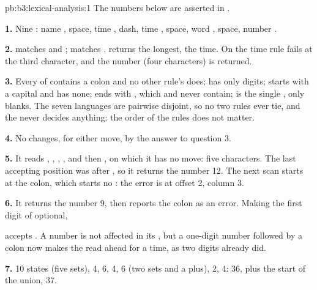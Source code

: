 \begin{solution}{pb:b3:lexical-analysis:1}
The numbers below are asserted in .

\textbf{1.} Nine : name , space, time , dash, time , space, word , space, number .

\textbf{2.}  matches  and ;  matches .  returns the longest, the time. On  the time rule fails at the third character, and the number  (four characters) is returned.

\textbf{3.} Every  of  contains a colon and no other rule's does;  has only digits;  starts with a capital and  has none;  ends with \code{>}, which  and  never contain;  is the single \code{-},  only blanks. The seven languages are pairwise disjoint, so no two rules ever tie, and the  never decides anything: the order of the rules does not matter.

\textbf{4.} No  changes, for either move, by the answer to question 3.

\textbf{5.} It reads , , \code{:}, , and then , on which it has no move: five characters. The last accepting position was after , so it returns the number 12. The next scan starts at the colon, which starts no : the error is at offset 2, column 3.

\textbf{6.} It returns the number 9, then reports the colon as an error. Making the first digit of  optional,
\begin{center}\end{center}
accepts . A number is not affected in its , but a one-digit number followed by a colon now makes the  read ahead for a time, as two digits already did.

\textbf{7.}  10 states (five sets),  4,  6,  4,  6 (two sets and a plus),  2,  4: 36, plus the start of the union, 37.


\end{solution}
